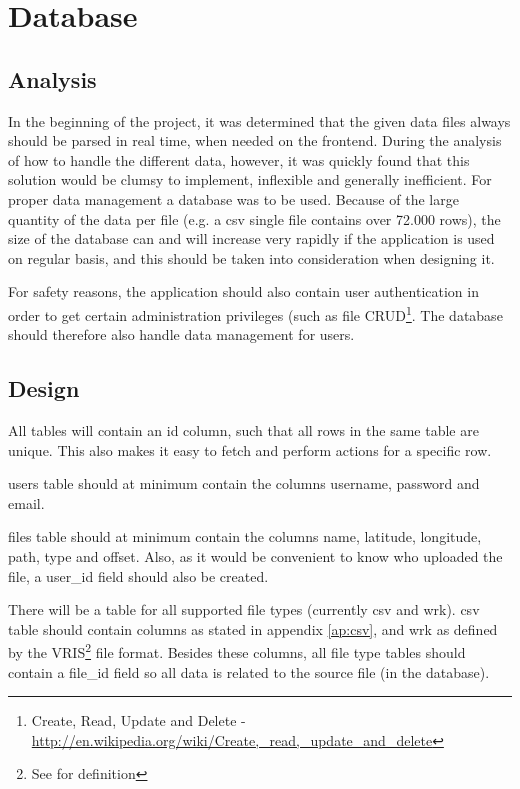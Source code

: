 \section{Database}

\subsection{Analysis}
In the beginning of the project, it was determined that the given data files always should be parsed in real time, when needed on the frontend. During the analysis of how to handle the different data, however, it was quickly found that this solution would be clumsy to implement, inflexible and generally inefficient.
For proper data management a database was to be used. Because of the large quantity of the data per file (e.g. a csv single file contains over 72.000 rows), the size of the database can and will increase very rapidly if the application is used on regular basis, and this should be taken into consideration when designing it.

For safety reasons, the application should also contain user authentication in order to get certain administration privileges (such as file CRUD\footnote{Create, Read, Update and Delete - \url{http://en.wikipedia.org/wiki/Create,_read,_update_and_delete}}. The database should therefore also handle data management for users.

\subsection{Design}
All tables will contain an \textsf{id} column, such that all rows in the same table are unique. This also makes it easy to fetch and perform actions for a specific row.

\textsf{users} table should at minimum contain the columns \textsf{username, password} and \textsf{email}.

\textsf{files} table should at minimum contain the columns \textsf{name, latitude, longitude, path, type} and \textsf{offset}.
Also, as it would be convenient to know who uploaded the file, a \textsf{user\_id} field should also be created.

There will be a table for all supported file types (currently \textsf{csv} and \textsf{wrk}). \textsf{csv} table should contain columns as stated in appendix \ref{ap:csv}, and \textsf{wrk} as defined by the VRIS\footnote{See \cite{VRIS} for definition} file format. Besides these columns, all file type tables should contain a \textsf{file\_id} field so all data is related to the source file (in the database).

